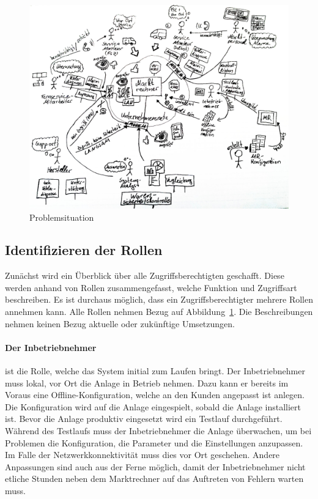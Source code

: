\documentclass[11pt,a4paper]{report}
\begin{document}
\begin{figure}[h]
\centering
\includegraphics[scale=0.237]{images/problemsituation.jpg}
\caption{Problemsituation}
\label{fig:current_setup}
\end{figure}

\subsection{Identifizieren der Rollen} \label{sec:roles}

Zunächst wird ein Überblick über alle Zugriffsberechtigten geschafft. Diese werden anhand von Rollen zusammengefasst, welche Funktion und Zugriffsart beschreiben. Es ist durchaus möglich, dass ein Zugriffsberechtigter mehrere Rollen annehmen kann. Alle Rollen nehmen Bezug auf Abbildung~\ref{fig:current_setup}. Die Beschreibungen nehmen keinen Bezug aktuelle oder zukünftige Umsetzungen.

\paragraph{Der Inbetriebnehmer} ist die Rolle, welche das System initial zum Laufen bringt. Der Inbetriebnehmer muss lokal, vor Ort die Anlage in Betrieb nehmen. Dazu kann er bereits im Voraus eine Offline-Konfiguration, welche an den Kunden angepasst ist anlegen. Die Konfiguration wird auf die Anlage eingespielt, sobald die Anlage installiert ist. Bevor die Anlage produktiv eingesetzt wird ein Testlauf durchgeführt. Während des Testlaufs muss der Inbetriebnehmer die Anlage überwachen, um bei Problemen die Konfiguration, die Parameter und die Einstellungen anzupassen. Im Falle der Netzwerkkonnektivität muss dies vor Ort geschehen. Andere  Anpassungen sind auch aus der Ferne möglich, damit der Inbetriebnehmer nicht etliche Stunden neben dem Marktrechner auf das Auftreten von Fehlern warten muss.
\end{document}
